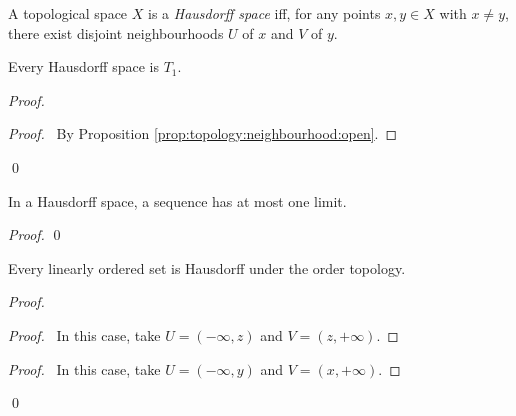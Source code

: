 \begin{df}
  A topological space $X$ is a \emph{Hausdorff space} iff, for any points $x,
  y
  \in X$ with $x \neq y$, there exist disjoint neighbourhoods $U$ of $x$ and
  $V$
  of $y$.
\end{df}

\begin{thm}
  Every Hausdorff space is $T_1$.
\end{thm}

\begin{proof}
  \pf
  \qedstep
  \begin{proof}
    \pf\ By Proposition \ref{prop:topology:neighbourhood:open}.
  \end{proof}
  \qed
\end{proof}

\begin{thm}
  In a Hausdorff space, a sequence has at most one limit.
\end{thm}

\begin{proof}
  \pf
  \qed
\end{proof}

\begin{thm}
  Every linearly ordered set is Hausdorff under the order topology.
\end{thm}

\begin{proof}
  \pf
  \begin{proof}
    \pf\ In this case, take $U = (-\infty, z)$ and $V = (z, +\infty)$.
  \end{proof}
  \begin{proof}
    \pf\ In this case, take $U = (-\infty, y)$ and $V = (x, +\infty)$.
  \end{proof}
  \qed
\end{proof}

